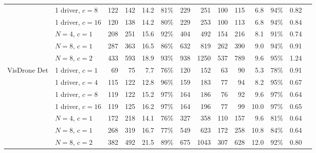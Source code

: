 \begin{table}[t]
\begin{center}
\begin{small}
\begin{sc}
{\begin{tabular}{llrrrrrrrrrrrr}
& 1 driver, $c{=}8$ & 122 & 142 & 14.2 & 81\% & 229 & 251 & 100 & 115 & 6.8 & 94\% & 0.82 \\
& 1 driver, $c{=}16$ & 120 & 138 & 14.2 & 80\% & 229 & 253 & 100 & 113 & 6.8 & 94\% & 0.84 \\
& $N{=}4$, $c{=}1$ & 208 & 251 & 15.6 & 92\% & 404 & 492 & 154 & 216 & 8.1 & 91\% & 0.74 \\
& $N{=}8$, $c{=}1$ & 287 & 363 & 16.5 & 86\% & 632 & 819 & 262 & 390 & 9.0 & 94\% & 0.91 \\
& $N{=}8$, $c{=}2$ & 433 & 593 & 18.9 & 93\% & 938 & 1250 & 537 & 789 & 9.6 & 95\% & 1.24 \\
\midrule
\multirow{7}{*}{VisDrone Det}
& 1 driver, $c{=}1$ & 69 & 75 & 7.7 & 76\% & 120 & 152 & 63 & 90 & 5.3 & 78\% & 0.91 \\
& 1 driver, $c{=}4$ & 115 & 122 & 12.8 & 96\% & 159 & 183 & 77 & 94 & 8.2 & 95\% & 0.67 \\
& 1 driver, $c{=}8$ & 119 & 122 & 15.2 & 97\% & 164 & 186 & 76 & 92 & 9.6 & 97\% & 0.64 \\
& 1 driver, $c{=}16$ & 119 & 125 & 16.2 & 97\% & 164 & 196 & 77 & 99 & 10.0 & 97\% & 0.65 \\
& $N{=}4$, $c{=}1$ & 172 & 218 & 14.1 & 76\% & 327 & 358 & 110 & 157 & 9.6 & 81\% & 0.64 \\
& $N{=}8$, $c{=}1$ & 268 & 319 & 16.7 & 77\% & 549 & 623 & 172 & 258 & 10.8 & 84\% & 0.64 \\
& $N{=}8$, $c{=}2$ & 382 & 492 & 21.5 & 89\% & 675 & 1043 & 307 & 628 & 12.0 & 92\% & 0.80 \\
\bottomrule
\end{tabular}}
\end{sc}\end{small}\end{center}
\vspace{-0.22in}
\end{table}
